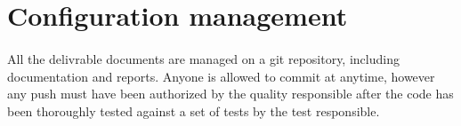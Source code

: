 \documentclass{report}
\begin{document}
\section{Configuration management}

\paragraph{}
\hspace{4mm}All the delivrable documents are managed on a git repository, including documentation and reports.
Anyone is allowed to commit at anytime, however any push must have been authorized by the quality responsible after the code
has been thoroughly tested against a set of tests by the test responsible.
\end{document}
